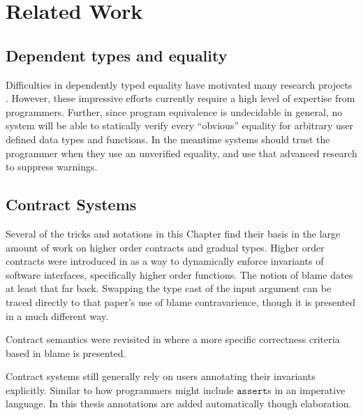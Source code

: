 \section{Related Work}

\subsection{Dependent types and equality}


Difficulties in dependently typed equality have motivated many research projects \cite{HoTTbook,sjoberg2015programming,cockx2021taming}.
However, these impressive efforts currently require a high level of expertise from programmers.
Further, since program equivalence is undecidable in general, no system will be able to statically verify every ``obvious'' equality for arbitrary user defined data types and functions.
In the meantime systems should trust the programmer when they use an unverified equality, and use that advanced research to suppress warnings. 

\subsection{Contract Systems}

Several of the tricks and notations in this Chapter find their basis in the large amount of work on higher order contracts and gradual types.
Higher order contracts were introduced in \cite{10.1145/581478.581484} as a way to dynamically enforce invariants of software interfaces, specifically higher order functions.
The notion of blame dates at least that far back. Swapping the type cast of the input argument can be traced directly to that paper's use of blame contravarience, though it is presented in a much different way.

Contract semantics were revisited in \cite{10.1145/1925844.1926410,10.1007/978-3-642-28869-2_11} where a more specific correctness criteria based in blame is presented.

Contract systems still generally rely on users annotating their invariants explicitly.
Similar to how programmers might include $\mathtt{assert}$s in an imperative language.
In this thesis annotations are added automatically though elaboration.

